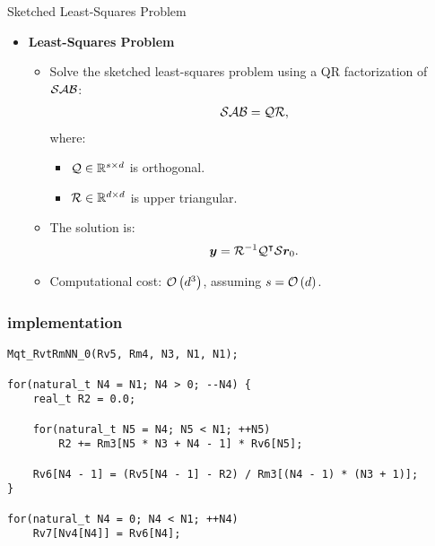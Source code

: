 \begin{frame}{Sketched Least-Squares Problem}
    \begin{itemize}
        \item \textbf{Least-Squares Problem}
        \begin{itemize}
            \item Solve the sketched least-squares problem using a QR factorization of $\mathcal{S} \mathcal{A} \mathcal{B}$:
            \begin{align}
                \mathcal{S} \mathcal{A} \mathcal{B} = \mathcal{Q} \mathcal{R},
            \end{align}
            where:
            \begin{itemize}
                \item $\mathcal{Q} \in \mathbb{R}^{s \times d}$ is orthogonal.
                \item $\mathcal{R} \in \mathbb{R}^{d \times d}$ is upper triangular.
            \end{itemize}
            \item The solution is:
            \begin{align}
                \bm{y} = \mathcal{R}^{-1} \mathcal{Q}^{\intercal} \mathcal{S} \bm{r}_0.
            \end{align}
            \item Computational cost: $\mathcal{O} \left( d^3 \right)$, assuming $s = \mathcal{O} \left( d \right)$.
        \end{itemize}
    \end{itemize}
\end{frame}

\begin{frame}[fragile] %
    \frametitle{implementation}

\begin{lstlisting}[style=cpp]
Mqt_RvtRmNN_0(Rv5, Rm4, N3, N1, N1);

for(natural_t N4 = N1; N4 > 0; --N4) {
    real_t R2 = 0.0;

    for(natural_t N5 = N4; N5 < N1; ++N5)
        R2 += Rm3[N5 * N3 + N4 - 1] * Rv6[N5];

    Rv6[N4 - 1] = (Rv5[N4 - 1] - R2) / Rm3[(N4 - 1) * (N3 + 1)];
}

for(natural_t N4 = 0; N4 < N1; ++N4)
    Rv7[Nv4[N4]] = Rv6[N4];
\end{lstlisting}

\end{frame}


